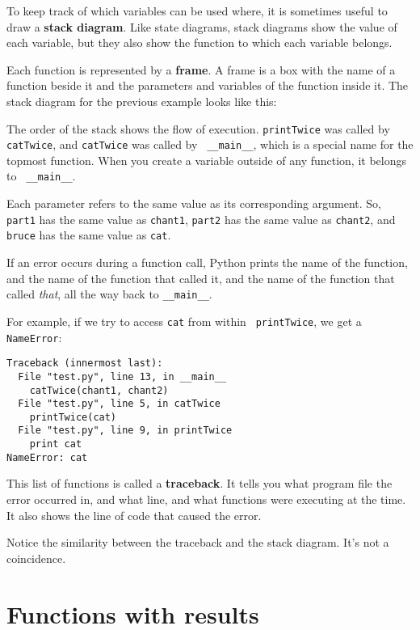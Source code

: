 To keep track of which variables can be used where, it is sometimes
useful to draw a {\bf stack diagram}.  Like state diagrams, stack
diagrams show the value of each variable, but they also show the
function to which each variable belongs.

Each function is represented by a {\bf frame}.  A frame is a box
with the name of a function
beside it and the parameters and variables of the function inside it.
The stack diagram for the
previous example looks like this:

\beforefig
\centerline{}
\afterfig

The order of the stack shows the flow of execution.  {\tt printTwice}
was called by {\tt catTwice}, and {\tt catTwice} was called by {\tt
\_\_main\_\_}, which is a special name for the topmost function.  When
you create a variable outside of any function, it belongs to {\tt
\_\_main\_\_}.

Each parameter refers to the same value as its corresponding
argument.  So, {\tt part1} has the same value as
{\tt chant1}, {\tt part2} has the same value as {\tt chant2},
and {\tt bruce} has the same value as {\tt cat}.

If an error occurs during a function call, Python prints the
name of the function, and the name of the function that called
it, and the name of the function that called {\em that}, all the
way back to {\tt \_\_main\_\_}.

For example, if we try to access {\tt cat} from within {\tt
printTwice}, we get a {\tt NameError}:

\beforeverb
\begin{verbatim}
Traceback (innermost last):
  File "test.py", line 13, in __main__
    catTwice(chant1, chant2)
  File "test.py", line 5, in catTwice
    printTwice(cat)
  File "test.py", line 9, in printTwice
    print cat
NameError: cat
\end{verbatim}
\afterverb
%
This list of functions is called a {\bf traceback}.  It tells you what
program file the error occurred in, and what line, and what functions
were executing at the time.  It also shows the line of code that
caused the error.


Notice the similarity between the traceback and the
stack diagram.  It's not a coincidence.


\section{Functions with results}

